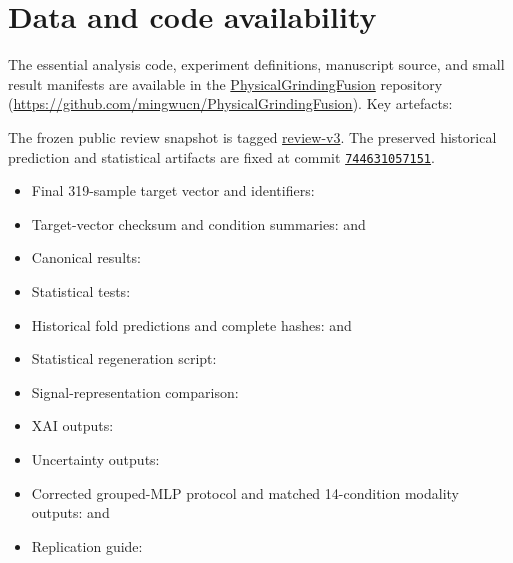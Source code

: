 \section*{Data and code availability}\label{data-and-code-availability}

The essential analysis code, experiment definitions, manuscript source, and
small result manifests are available in the
\href{https://github.com/mingwucn/PhysicalGrindingFusion}{PhysicalGrindingFusion}
repository (\url{https://github.com/mingwucn/PhysicalGrindingFusion}). Key artefacts:

The frozen public review snapshot is tagged
\href{https://github.com/mingwucn/PhysicalGrindingFusion/tree/review-v3}{review-v3}.
The preserved historical prediction and statistical artifacts are fixed at
commit
\href{https://github.com/mingwucn/PhysicalGrindingFusion/commit/7446310571510fd615da7a86a0fb31ebe0ffd31d}{\texttt{744631057151}}.

\begin{itemize}
\tightlist
\item
  Final 319-sample target vector and identifiers:
\item
  Target-vector checksum and condition summaries:
  and 
\item
  Canonical results:
\item
  Statistical tests:
\item
  Historical fold predictions and complete hashes:
   and
\item
  Statistical regeneration script:
\item
  Signal-representation comparison:
\item
  XAI outputs: 
\item
  Uncertainty outputs: 
\item
  Corrected grouped-MLP protocol and matched 14-condition modality outputs:
   and
\item
  Replication guide: 
\end{itemize}

